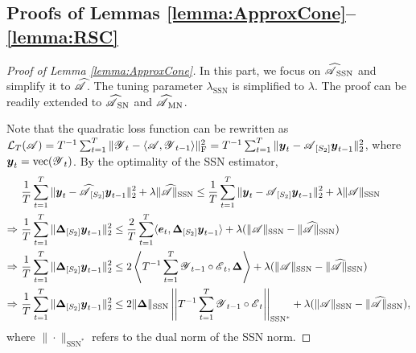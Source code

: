 \documentclass[12pt]{article}
\newcommand{\bm}{\boldsymbol}
\newcommand{\cm}[1]{\mbox{\boldmath$\mathscr{#1}$}}
\begin{document}
\subsection{Proofs of Lemmas \ref{lemma:ApproxCone}--\ref{lemma:RSC} \label{subsec:lemma}}



\begin{proof}[Proof of Lemma \ref{lemma:ApproxCone}]
	
	In this part, we focus on $\cm{\widehat{A}}_{\text{SSN}}$ and simplify it to $\cm{\widehat{A}}$. The tuning parameter $\lambda_{\text{SSN}}$ is simplified to $\lambda$. The proof can be readily extended to $\cm{\widehat{A}}_{\text{SN}}$ and $\cm{\widehat{A}}_{\text{MN}}$.
	
	Note that the quadratic loss function can be rewritten as $\mathcal{L}_T(\cm{A})=T^{-1}\sum_{t=1}^{T}\|\cm{Y}_t-\langle\cm{A},\cm{Y}_{t-1}\rangle\|_\text{F}^2=T^{-1}\sum_{t=1}^T\|\bm{y}_t-\cm{A}_{[S_2]}\bm{y}_{t-1}\|_2^2$, where $\bm{y}_t=\text{vec}(\cm{Y}_t)$.	
	By the optimality of the SSN estimator,
	\begin{equation}\begin{split}
	&\frac{1}{T}\sum_{t=1}^T\|\bm{y}_t-\cm{\widehat{A}}_{[S_2]}\bm{y}_{t-1}\|_2^2+\lambda\|\cm{\widehat{A}}\|_{\text{SSN}}\leq\frac{1}{T}\sum_{t=1}^T\|\bm{y}_t-\cm{A}_{[S_2]}\bm{y}_{t-1}\|_2^2+\lambda\|\cm{A}\|_{\text{SSN}}\\
	\Rightarrow~&\frac{1}{T}\sum_{t=1}^T\|\bm{\Delta}_{[S_2]}\bm{y}_{t-1}\|_2^2\leq\frac{2}{T}\sum_{t=1}^T\langle\bm{e}_t,\bm{\Delta}_{[S_2]}\bm{y}_{t-1}\rangle+\lambda(\|\cm{A}\|_{\text{SSN}}-\|\cm{\widehat{A}}\|_{\text{SSN}})\\
	\Rightarrow~&\frac{1}{T}\sum_{t=1}^T\|\bm{\Delta}_{[S_2]}\bm{y}_{t-1}\|_2^2\leq2\left\langle T^{-1}\sum_{t=1}^T\cm{Y}_{t-1}\circ\cm{E}_t,\bm{\Delta}\right\rangle+\lambda(\|\cm{A}\|_{\text{SSN}}-\|\cm{\widehat{A}}\|_{\text{SSN}})\\
	\Rightarrow~&\frac{1}{T}\sum_{t=1}^T\|\bm{\Delta}_{[S_2]}\bm{y}_{t-1}\|_2^2\leq2\|\bm{\Delta}\|_{\text{SSN}}\left|\left|T^{-1}\sum_{t=1}^T\cm{Y}_{t-1}\circ\cm{E}_t\right|\right|_{\text{SSN}^*}+\lambda(\|\cm{A}\|_{\text{SSN}}-\|\cm{\widehat{A}}\|_{\text{SSN}}),
	\end{split}\end{equation}
	where $\|\cdot\|_{\text{SSN}^*}$ refers to the dual norm of the SSN norm.
	

\end{proof}
\end{document}
